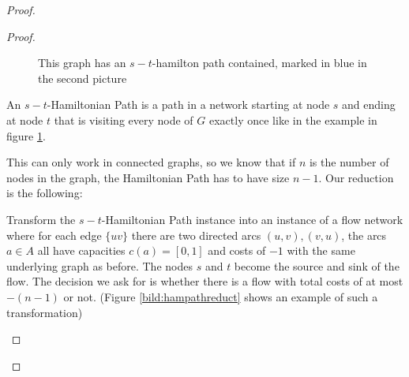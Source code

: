 \begin{proof}
\begin{proof}
\begin{figure}[h!]
\centering
{}
\caption{This graph has an $s-t$-hamilton path contained, marked in blue in the second picture}
\label{bild:hampath}
\end{figure}

An $s-t$-Hamiltonian Path is a path in a network starting at node $s$ and ending at node $t$ that is visiting every 
node of $G$ exactly once like in the example in figure \ref{bild:hampath}. 

This can only work in connected graphs, so 
we know that if $n$ is the number of nodes in the 
graph, the Hamiltonian Path has to have size $n-1$. Our reduction is the following:

Transform the $s-t$-Hamiltonian Path instance into an instance of a flow network where for each edge $\{uv\}$ there 
are two directed arcs $(u,v),(v,u)$, the arcs $a\in A$ all have capacities $c(a)=[0,1]$ and costs of $-1$ 
with the same underlying graph as before. The nodes $s$ and $t$ become the source and sink of the flow.%
The decision we ask for is whether there is a flow with total costs of at most $-(n-1)$ or not. (Figure 
\ref{bild:hampathreduct} shows an example of such a transformation)

 
\begin{figure}[h!]
\centering
{}
\end{figure}
\end{proof}
\end{proof}
